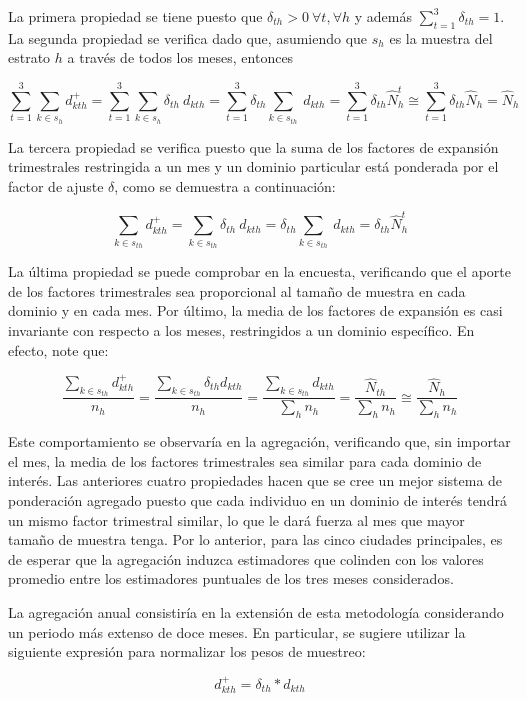 \documentclass[
  12pt,
  spanish,
]{book}
\begin{document}
La primera propiedad se tiene puesto que
\(\delta_{th} > 0 \ \forall t, \forall h\) y además
\(\sum_{t=1}^3 \delta_{th} = 1\). La segunda propiedad se verifica dado
que, asumiendo que \(s_{h}\) es la muestra del estrato \(h\) a través de
todos los meses, entonces

\[
\sum_{t=1}^3\sum_{k\in s_{h}} d_{kth}^{+}
=\sum_{t=1}^3\sum_{k\in s_h}\delta_{th}\ d_{kth}
=\sum_{t=1}^3\delta_{th}\sum_{k\in s_{th}}\ d_{kth} 
=\sum_{t=1}^3\delta_{th}\hat{N}_h^t 
\cong \sum_{t=1}^3\delta_{th}\hat{N}_h = \hat{N}_h
\]

La tercera propiedad se verifica puesto que la suma de los factores de
expansión trimestrales restringida a un mes y un dominio particular está
ponderada por el factor de ajuste \(\delta\), como se demuestra a
continuación:

\[
\sum_{k\in s_{th}} d_{kth}^{+}=\sum_{k\in s_{th}}\delta_{th}\ d_{kth}
=\delta_{th}\sum_{k\in s_{th}}\ d_{kth} 
=\delta_{th}\hat{N}_h^t
\]

La última propiedad se puede comprobar en la encuesta, verificando que el aporte de los factores trimestrales sea proporcional al tamaño de muestra en cada dominio y en cada mes. Por último, la media de los factores de expansión es casi invariante con
respecto a los meses, restringidos a un dominio específico. En efecto,
note que:

\[
\frac{\sum_{k\in s_{th}} d_{kth}^{+}}{n_{h}}
=\frac{\sum_{k\in s_{th}} \delta_{th} d_{kth}}{n_{h}}
=\frac{\sum_{k\in s_{th}} d_{kth}}{\sum_h n_h}
=\frac{\hat{N}_{th}}{\sum_h n_h}
\cong \frac{\hat{N}_{h}}{\sum_h n_h}
\]

Este comportamiento se observaría en la agregación, verificando que, sin importar el mes, la media de los factores trimestrales sea similar para cada dominio de interés. Las anteriores cuatro propiedades hacen que se cree un mejor sistema de
ponderación agregado puesto que cada individuo en un dominio de interés
tendrá un mismo factor trimestral similar, lo que le dará fuerza al mes
que mayor tamaño de muestra tenga. Por lo anterior, para las cinco
ciudades principales, es de esperar que la agregación induzca
estimadores que colinden con los valores promedio entre los estimadores
puntuales de los tres meses considerados.

La agregación anual consistiría en la extensión de esta metodología
considerando un periodo más extenso de doce meses. En particular, se sugiere utilizar la siguiente expresión para normalizar los pesos de muestreo:

\[
d_{kth}^{+}=\delta_{th}* d_{kth}
\]
\end{document}
